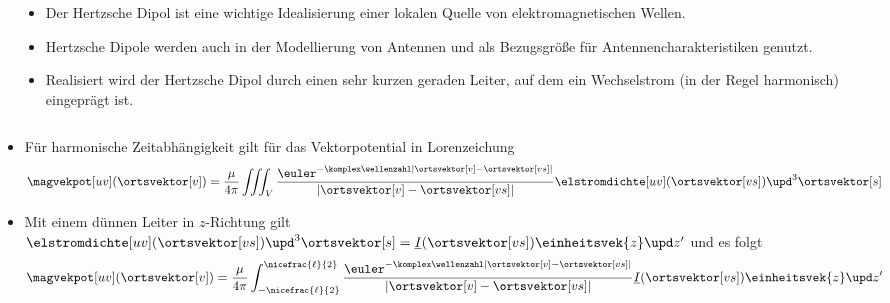 \begin{frame}
\begin{columns}
\begin{column}{.35\textwidth}
\begin{tikzpicture}[scale=5,tdplot_main_coords]
\end{tikzpicture}
\end{column}
\begin{column}{.65\textwidth}
  \begin{itemize}[<+->]
  \item Der \alert{Hertzsche Dipol} ist eine wichtige Idealisierung einer lokalen Quelle von elektromagnetischen Wellen.
    \item Hertzsche Dipole werden auch in der Modellierung von Antennen und als Bezugsgröße für Antennencharakteristiken genutzt.
    \item Realisiert wird der Hertzsche Dipol durch einen sehr kurzen geraden Leiter, auf dem ein Wechselstrom (in der Regel harmonisch) eingeprägt ist.
      \end{itemize}
\end{column}
\end{columns}
  \begin{itemize}[<+->]
    \item Für harmonische Zeitabhängigkeit gilt für das Vektorpotential in Lorenzeichung
      \begin{equation*}
        \magvekpot[uv](\ortsvektor[v]) = \frac{\mu}{4\pi} \iiint_V \frac{\euler^{-\komplex\wellenzahl|\ortsvektor[v]-\ortsvektor[vs]|}}{|\ortsvektor[v]-\ortsvektor[vs]|} \elstromdichte[uv](\ortsvektor[vs]) \upd^3 \ortsvektor[s]
        \end{equation*}
    \item Mit einem \alert{dünnen Leiter} in \(z\)-Richtung gilt \(\elstromdichte[uv](\ortsvektor[vs]) \upd^3 \ortsvektor[s] = \underline{I}(\ortsvektor[vs])\einheitsvek{z}\upd z^\prime \) und es folgt
      \begin{equation*}
        \magvekpot[uv](\ortsvektor[v]) = \frac{\mu}{4\pi} \int_{-\nicefrac{\ell}{2}}^{\nicefrac{\ell}{2}} \frac{\euler^{-\komplex\wellenzahl |\ortsvektor[v]-\ortsvektor[vs]|}}{|\ortsvektor[v]-\ortsvektor[vs]|} \underline{I}(\ortsvektor[vs])\einheitsvek{z}\upd z^\prime
        \end{equation*}
\end{itemize}
\end{frame}


